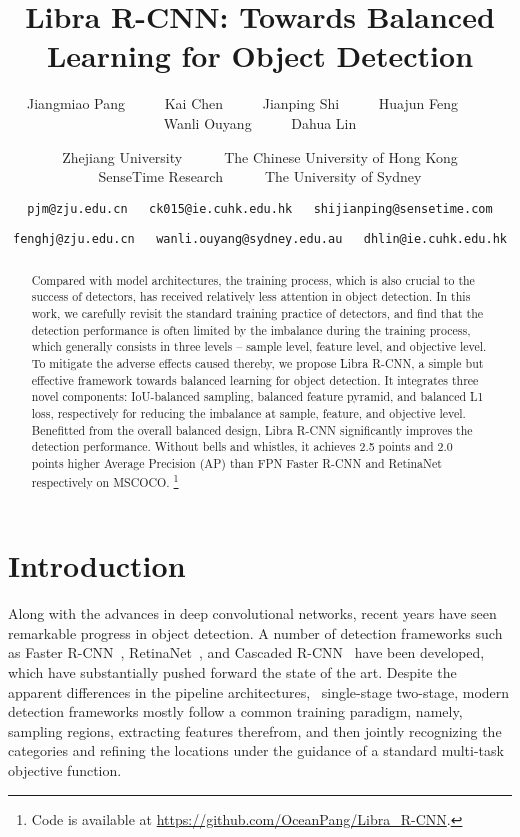 \documentclass[10pt,twocolumn,letterpaper]{article}
\begin{document}
\title{Libra R-CNN: Towards Balanced Learning for Object Detection}
\author{
Jiangmiao Pang~~~~~
Kai Chen~~~~~
Jianping Shi~~~~~
Huajun Feng~~~~~
Wanli Ouyang~~~~~
Dahua Lin
\\
\and
Zhejiang University~~~~~~The Chinese University of Hong Kong\\
SenseTime Research~~~~~~The University of Sydney\\
\and
{\tt\small pjm@zju.edu.cn~~~ck015@ie.cuhk.edu.hk~~~shijianping@sensetime.com}
\and
{\tt\small fenghj@zju.edu.cn~~~wanli.ouyang@sydney.edu.au~~~dhlin@ie.cuhk.edu.hk}
}
\maketitle
\thispagestyle{empty}



\begin{abstract}
Compared with model architectures, the training process, which is also
crucial to the success of detectors,
has received relatively less attention in object detection.
In this work, we carefully revisit the standard training practice of detectors,
and find that the detection performance is often limited by the imbalance
during the training process, which generally consists in three levels --
sample level, feature level, and objective level.
To mitigate the adverse effects caused thereby, we propose
Libra R-CNN, a simple but effective framework towards balanced learning for object detection.
It integrates three novel components:
IoU-balanced sampling, balanced feature pyramid, and balanced L1 loss,
respectively for reducing the imbalance at sample, feature, and objective level.
Benefitted from the overall balanced design, Libra R-CNN significantly improves the detection performance.
Without bells and whistles, it achieves 2.5 points and 2.0 points higher Average Precision (AP) than FPN
Faster R-CNN and RetinaNet respectively on MSCOCO.
\footnote{Code is available at \url{https://github.com/OceanPang/Libra_R-CNN}.}
\end{abstract}
 

\section{Introduction}

Along with the advances in deep convolutional networks, recent years have
seen remarkable progress in object detection.
A number of detection frameworks such as
Faster R-CNN~\cite{frcnn},
RetinaNet~\cite{focalloss},
and Cascaded R-CNN~\cite{cascadercnn} have been developed,
which have substantially pushed forward the state of the art.
Despite the apparent differences in the pipeline architectures,
\eg~single-stage \vs two-stage, modern detection frameworks mostly follow
a common training paradigm, namely, sampling regions, extracting features therefrom,
and then jointly recognizing the categories and refining the locations
under the guidance of a standard multi-task objective function.
\end{document}
